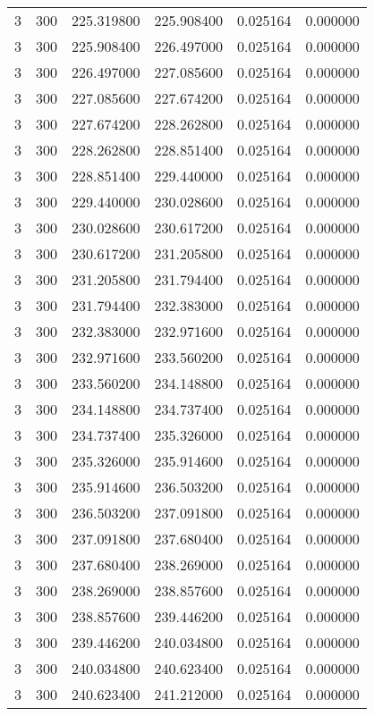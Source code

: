 \begin{longtable}{rrrrrr}
3 & 300 & 225.319800 & 225.908400 & 0.025164 & 0.000000 \\
3 & 300 & 225.908400 & 226.497000 & 0.025164 & 0.000000 \\
3 & 300 & 226.497000 & 227.085600 & 0.025164 & 0.000000 \\
3 & 300 & 227.085600 & 227.674200 & 0.025164 & 0.000000 \\
3 & 300 & 227.674200 & 228.262800 & 0.025164 & 0.000000 \\
3 & 300 & 228.262800 & 228.851400 & 0.025164 & 0.000000 \\
3 & 300 & 228.851400 & 229.440000 & 0.025164 & 0.000000 \\
3 & 300 & 229.440000 & 230.028600 & 0.025164 & 0.000000 \\
3 & 300 & 230.028600 & 230.617200 & 0.025164 & 0.000000 \\
3 & 300 & 230.617200 & 231.205800 & 0.025164 & 0.000000 \\
3 & 300 & 231.205800 & 231.794400 & 0.025164 & 0.000000 \\
3 & 300 & 231.794400 & 232.383000 & 0.025164 & 0.000000 \\
3 & 300 & 232.383000 & 232.971600 & 0.025164 & 0.000000 \\
3 & 300 & 232.971600 & 233.560200 & 0.025164 & 0.000000 \\
3 & 300 & 233.560200 & 234.148800 & 0.025164 & 0.000000 \\
3 & 300 & 234.148800 & 234.737400 & 0.025164 & 0.000000 \\
3 & 300 & 234.737400 & 235.326000 & 0.025164 & 0.000000 \\
3 & 300 & 235.326000 & 235.914600 & 0.025164 & 0.000000 \\
3 & 300 & 235.914600 & 236.503200 & 0.025164 & 0.000000 \\
3 & 300 & 236.503200 & 237.091800 & 0.025164 & 0.000000 \\
3 & 300 & 237.091800 & 237.680400 & 0.025164 & 0.000000 \\
3 & 300 & 237.680400 & 238.269000 & 0.025164 & 0.000000 \\
3 & 300 & 238.269000 & 238.857600 & 0.025164 & 0.000000 \\
3 & 300 & 238.857600 & 239.446200 & 0.025164 & 0.000000 \\
3 & 300 & 239.446200 & 240.034800 & 0.025164 & 0.000000 \\
3 & 300 & 240.034800 & 240.623400 & 0.025164 & 0.000000 \\
3 & 300 & 240.623400 & 241.212000 & 0.025164 & 0.000000 \\

\end{longtable}
